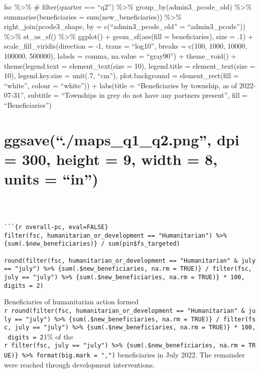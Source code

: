 \documentclass[
]{article}
\begin{document}
fsc \%\textgreater\% \# filter(quarter == ``q2'') \%\textgreater\%
group\_by(admin3\_pcode\_old) \%\textgreater\% summarise(beneficiaries =
sum(new\_beneficiaries)) \%\textgreater\% right\_join(pcode3\_shape, by
= c(``admin3\_pcode\_old'' = ``admin3\_pcode'')) \%\textgreater\%
st\_as\_sf() \%\textgreater\% ggplot() + geom\_sf(aes(fill =
beneficiaries), size = .1) + scale\_fill\_viridis(direction = -1, trans
= ``log10'', breaks = c(100, 1000, 10000, 100000, 500000), labels =
comma, na.value = ``gray90'') + theme\_void() + theme(legend.text =
element\_text(size = 10), legend.title = element\_text(size = 10),
legend.key.size = unit(.7, ``cm''), plot.background = element\_rect(fill
= ``white'', colour = ``white'')) + labs(title = ``Beneficiaries by
township, as of 2022-07-31'', subtitle = ``Townships in grey do not have
any partners present'', fill = ``Beneficiaries'')

\hypertarget{ggsave.maps_q1_q2.png-dpi-300-height-9-width-8-units-in}{%
\section{ggsave(``./maps\_q1\_q2.png'', dpi = 300, height = 9, width =
8, units =
``in'')}\label{ggsave.maps_q1_q2.png-dpi-300-height-9-width-8-units-in}}

\begin{verbatim}



```{r overall-pc, eval=FALSE}
filter(fsc, humanitarian_or_development == "Humanitarian") %>% {sum(.$new_beneficiaries)} / sum(pin$fs_targeted)

round(filter(fsc, humanitarian_or_development == "Humanitarian" & july == "july") %>% {sum(.$new_beneficiaries, na.rm = TRUE)} / filter(fsc, july == "july") %>% {sum(.$new_beneficiaries, na.rm = TRUE)} * 100, digits = 2)
\end{verbatim}

Beneficiaries of humanitarian action formed
\texttt{r\ round(filter(fsc,\ humanitarian\_or\_development\ ==\ "Humanitarian"\ \&\ july\ ==\ "july")\ \%\textgreater{}\%\ \{sum(.\$new\_beneficiaries,\ na.rm\ =\ TRUE)\}\ /\ filter(fsc,\ july\ ==\ "july")\ \%\textgreater{}\%\ \{sum(.\$new\_beneficiaries,\ na.rm\ =\ TRUE)\}\ *\ 100,\ digits\ =\ 2)}\%
of the
\texttt{r\ filter(fsc,\ july\ ==\ "july")\ \%\textgreater{}\%\ \{sum(.\$new\_beneficiaries,\ na.rm\ =\ TRUE)\}\ \%\textgreater{}\%\ format(big.mark\ =\ ",")}
beneficiaries in July 2022. The remainder were reached through
development interventions.
\end{document}
